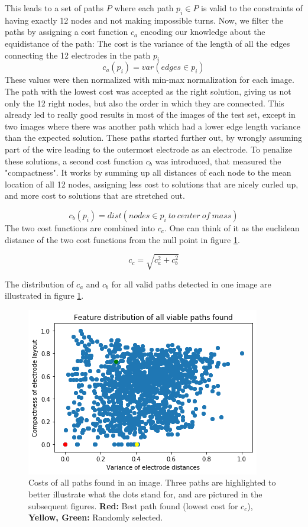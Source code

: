 \documentclass[a4paper, 11pt]{article}
\begin{document}
\begin{enumerate}
This leads to a set of paths $P$ where each path $p_i \in P$ is valid to the constraints of having exactly 12 nodes and not making impossible turns. Now, we filter the paths by assigning a cost function $c_a$ encoding our knowledge about the equidistance of the path: The cost is the variance of the length of all the edges connecting the 12 electrodes in the path $p_i$
$$ c_a(p_i)=var(edges\in p_i)$$
These values were then normalized with min-max normalization for each image. The path with the lowest cost was accepted as the right solution, giving us not only the 12 right nodes, but also the order in which they are connected.
This already led to really good results in most of the images of the test set, except in two images where there was another path which had a lower edge length variance than the expected solution. These paths started further out, by wrongly assuming part of the wire leading to the outermost electrode as an electrode. To penalize these solutions, a second cost function $c_b$ was introduced, that measured the "compactness". It works by summing up all distances of each node to the mean location of all 12 nodes, assigning less cost to solutions that are nicely curled up, and more cost to solutions that are stretched out. 

$$ c_b(p_i)=dist (nodes \in p_i\ to\ center\ of\ mass)$$
The two cost functions are combined into $c_ {c}$. One can think of it as the euclidean distance of the two cost functions from the null point in figure \ref{feature_distribution}.

$$c_{c} = \sqrt{c_a^2+c_b^2}$$

The distribution of $c_a$ and $c_b$ for all valid paths detected in one image are illustrated in figure \ref{feature_distribution}.

\begin{figure}[ht]
	\centering
  \includegraphics[width=.5\textwidth]{feature_distribution.png}
	\caption{Costs of all paths found in an image. Three paths are highlighted to better illustrate what the dots stand for, and are pictured in the subsequent figures. \textbf{Red:} Best path found (lowest cost for $c_c$), \textbf{Yellow, Green:} Randomly selected.}
	\label{feature_distribution}
\end{figure}



\end{enumerate}
\end{document}
